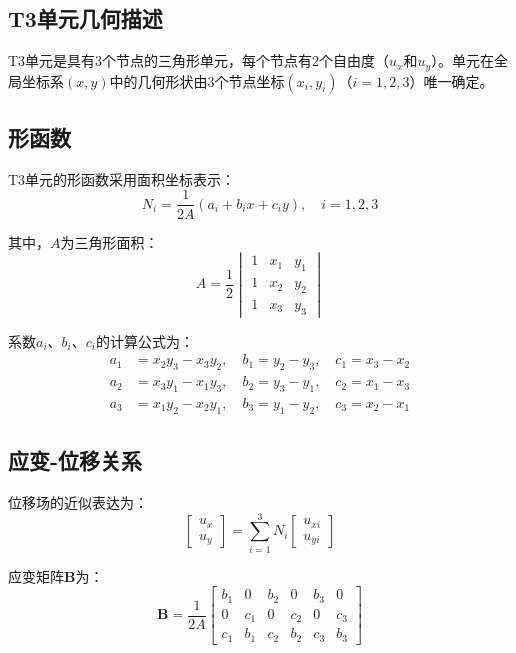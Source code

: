 \documentclass[12pt,a4paper]{article}
\begin{document}
\subsection{T3单元几何描述}

T3单元是具有3个节点的三角形单元，每个节点有2个自由度（$u_x$和$u_y$）。单元在全局坐标系$(x,y)$中的几何形状由3个节点坐标$(x_i, y_i)$（$i=1,2,3$）唯一确定。

\subsection{形函数}

T3单元的形函数采用面积坐标表示：
\begin{equation}
N_i = \frac{1}{2A}(a_i + b_i x + c_i y), \quad i=1,2,3
\end{equation}

其中，$A$为三角形面积：
\begin{equation}
A = \frac{1}{2}\begin{vmatrix}
1 & x_1 & y_1 \\
1 & x_2 & y_2 \\
1 & x_3 & y_3
\end{vmatrix}
\end{equation}

系数$a_i$、$b_i$、$c_i$的计算公式为：
\begin{align}
a_1 &= x_2y_3 - x_3y_2, \quad b_1 = y_2 - y_3, \quad c_1 = x_3 - x_2 \\
a_2 &= x_3y_1 - x_1y_3, \quad b_2 = y_3 - y_1, \quad c_2 = x_1 - x_3 \\
a_3 &= x_1y_2 - x_2y_1, \quad b_3 = y_1 - y_2, \quad c_3 = x_2 - x_1
\end{align}

\subsection{应变-位移关系}

位移场的近似表达为：
\begin{equation}
\begin{bmatrix} u_x \\ u_y \end{bmatrix} = \sum_{i=1}^{3} N_i \begin{bmatrix} u_{xi} \\ u_{yi} \end{bmatrix}
\end{equation}

应变矩阵$\mathbf{B}$为：
\begin{equation}
\mathbf{B} = \frac{1}{2A} \begin{bmatrix}
b_1 & 0 & b_2 & 0 & b_3 & 0 \\
0 & c_1 & 0 & c_2 & 0 & c_3 \\
c_1 & b_1 & c_2 & b_2 & c_3 & b_3
\end{bmatrix}
\end{equation}
\end{document}
